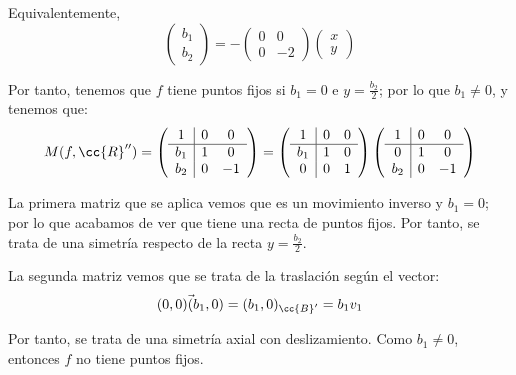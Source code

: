 \begin{enumerate}
    Equivalentemente,
    \begin{equation*}
        \left(\begin{array}{c}
            b_1 \\ b_2
        \end{array}\right)
        = -\left(\begin{array}{cc}
            0 & 0 \\
            0 & -2
        \end{array}\right)
        \left(\begin{array}{c}
            x \\ y
        \end{array}\right)
    \end{equation*}

    Por tanto, tenemos que $f$ tiene puntos fijos si $b_1=0$ e $y=\frac{b_2}{2}$; por lo que $b_1\neq 0$, y tenemos que:
    \begin{equation*}
        M(f,\cc{R}'') = \left(\begin{array}{c|cc}
            1 & 0 & 0 \\ \hline
            b_1 & 1 & 0 \\ 
            b_2 & 0 & -1
        \end{array}\right) = \left(\begin{array}{c|cc}
            1 & 0 & 0 \\ \hline
            b_1 & 1 & 0 \\ 
            0 & 0 & 1
        \end{array}\right)\left(\begin{array}{c|cc}
            1 & 0 & 0 \\ \hline
            0 & 1 & 0 \\ 
            b_2 & 0 & -1
        \end{array}\right)
    \end{equation*}

    La primera matriz que se aplica vemos que es un movimiento inverso y $b_1=0$; por lo que acabamos de ver que tiene una recta de puntos fijos. Por tanto, se trata de una simetría respecto de la recta $y=\frac{b_2}{2}$.

    La segunda matriz vemos que se trata de la traslación según el vector:
    \begin{equation*}
        \vec{(0,0)(b_1, 0)} = (b_1, 0)_{\cc{B}'} = b_1v_1
    \end{equation*}

    Por tanto, se trata de una simetría axial con deslizamiento. Como $b_1\neq 0$, entonces $f$ no tiene puntos fijos.
    
\end{enumerate}


